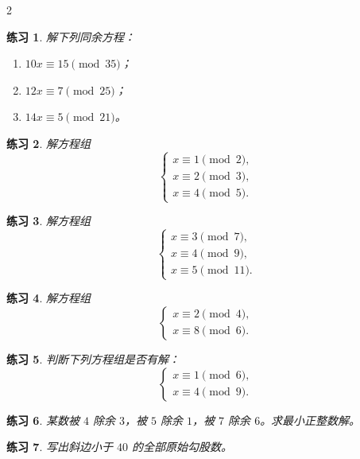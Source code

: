 \documentclass[11pt,a4paper,fontset=fandol]{ctexart}
\theoremstyle{formaltheorem}
\theoremstyle{formalexample}
\newtheorem{exercise}{练习}[section]
\newcommand{\smallblank}{\vspace{1.2cm}}
\begin{document}
\begin{multicols}{2}

\begin{exercise}
解下列同余方程：
\begin{enumerate}
  \item $10x\equiv 15\pmod{35}$；
  \item $12x\equiv 7\pmod{25}$；
  \item $14x\equiv 5\pmod{21}$。
\end{enumerate}
\end{exercise}
\smallblank

\begin{exercise}
解方程组
\[
\begin{cases}
x\equiv 1\pmod 2,\\
x\equiv 2\pmod 3,\\
x\equiv 4\pmod 5.
\end{cases}
\]
\end{exercise}
\smallblank

\begin{exercise}
解方程组
\[
\begin{cases}
x\equiv 3\pmod 7,\\
x\equiv 4\pmod 9,\\
x\equiv 5\pmod{11}.
\end{cases}
\]
\end{exercise}
\smallblank

\begin{exercise}
解方程组
\[
\begin{cases}
x\equiv 2\pmod 4,\\
x\equiv 8\pmod 6.
\end{cases}
\]
\end{exercise}
\smallblank

\begin{exercise}
判断下列方程组是否有解：
\[
\begin{cases}
x\equiv 1\pmod 6,\\
x\equiv 4\pmod 9.
\end{cases}
\]
\end{exercise}
\smallblank

\begin{exercise}
某数被 $4$ 除余 $3$，被 $5$ 除余 $1$，被 $7$ 除余 $6$。求最小正整数解。
\end{exercise}
\smallblank

\begin{exercise}
写出斜边小于 $40$ 的全部原始勾股数。
\end{exercise}
\smallblank


\end{multicols}
\end{document}
